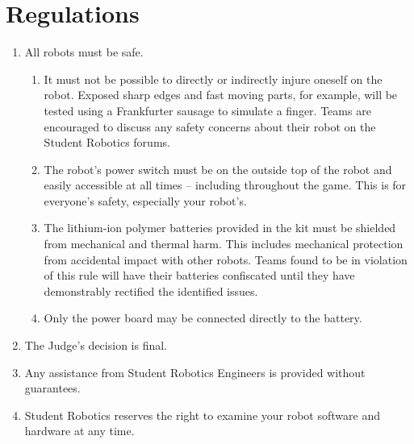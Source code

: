 \section {Regulations}
\label{sec:Regulations}

\begin{enumerate}


\item All robots must be safe.

\begin{enumerate}
  \item It must not be possible to directly or indirectly injure oneself on the robot.
        Exposed sharp edges and fast moving parts, for example, will be tested using a Frankfurter sausage to simulate a finger.
        Teams are encouraged to discuss any safety concerns about their robot on the Student Robotics forums.

  \item The robot's power switch must be on the outside top of the robot and easily accessible at all times -- including throughout the game.
        This is for everyone's safety, especially your robot's.

  \item The lithium-ion polymer batteries provided in the kit must be shielded from mechanical and thermal harm.
        This includes mechanical protection from accidental impact with other robots.
        Teams found to be in violation of this rule will have their batteries confiscated until they have demonstrably rectified the identified issues.

  \item Only the power board may be connected directly to the battery.
\end{enumerate}


\item The Judge's decision is final.
\item Any assistance from Student Robotics Engineers is provided without guarantees.
\item Student Robotics reserves the right to examine your robot software and hardware at any time.



\end{enumerate}
